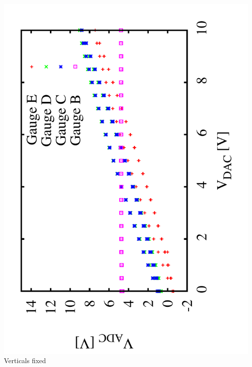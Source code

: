 \documentclass[a4paper,11pt]{book}
\begin{document}
 \includegraphics[angle=-90,scale=0.20]{image_ai_02.pdf}\\
Verticals fixed
\end{document}
